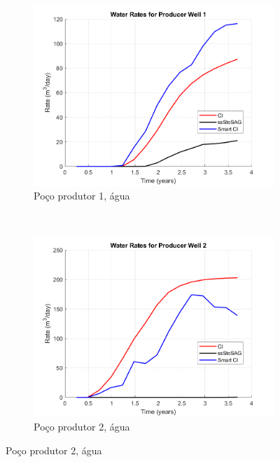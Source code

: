 \begin{figure}[!ht]
	\centering
	\begin{subfigure}[b]{.45\textwidth}
		\includegraphics[width=\textwidth]{figs/resultadosEgg/imgsim4/EGG_WaterWell1_Zoom}
		\caption{Po\c{c}o produtor 1, \'{a}gua}
		\label{EGG4_WaterWell1}
	\end{subfigure}
	~
	\begin{subfigure}[b]{.45\textwidth}
		\includegraphics[width=\textwidth]{figs/resultadosEgg/imgsim4/EGG_WaterWell2_Zoom}
		\caption{Po\c{c}o produtor 2, \'{a}gua}
		\label{EGG4_WaterWell2}
	\end{subfigure}
	

\end{figure}
